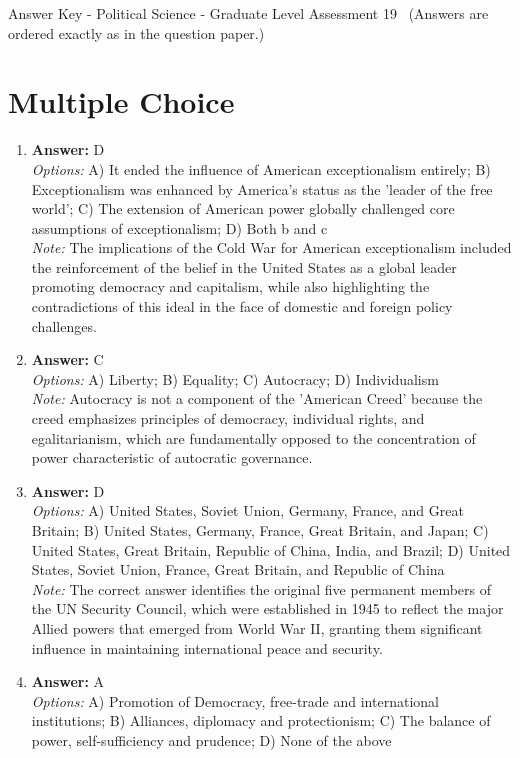 \documentclass[12pt]{article}
\begin{document}
\begin{center}
Answer Key - Political Science - Graduate Level Assessment 19 \
\small (Answers are ordered exactly as in the question paper.)
\end{center}

\section*{Multiple Choice}
\begin{enumerate}[label=\arabic*.]
\item \textbf{Answer:} D
\\ \textit{Options:} A) It ended the influence of American exceptionalism entirely; B) Exceptionalism was enhanced by America's status as the 'leader of the free world'; C) The extension of American power globally challenged core assumptions of exceptionalism; D) Both b and c
\\ \textit{Note:} The implications of the Cold War for American exceptionalism included the reinforcement of the belief in the United States as a global leader promoting democracy and capitalism, while also highlighting the contradictions of this ideal in the face of domestic and foreign policy challenges.
\item \textbf{Answer:} C
\\ \textit{Options:} A) Liberty; B) Equality; C) Autocracy; D) Individualism
\\ \textit{Note:} Autocracy is not a component of the 'American Creed' because the creed emphasizes principles of democracy, individual rights, and egalitarianism, which are fundamentally opposed to the concentration of power characteristic of autocratic governance.
\item \textbf{Answer:} D
\\ \textit{Options:} A) United States, Soviet Union, Germany, France, and Great Britain; B) United States, Germany, France, Great Britain, and Japan; C) United States, Great Britain, Republic of China, India, and Brazil; D) United States, Soviet Union, France, Great Britain, and Republic of China
\\ \textit{Note:} The correct answer identifies the original five permanent members of the UN Security Council, which were established in 1945 to reflect the major Allied powers that emerged from World War II, granting them significant influence in maintaining international peace and security.
\item \textbf{Answer:} A
\\ \textit{Options:} A) Promotion of Democracy, free-trade and international institutions; B) Alliances, diplomacy and protectionism; C) The balance of power, self-sufficiency and prudence; D) None of the above

\end{enumerate}
\end{document}
